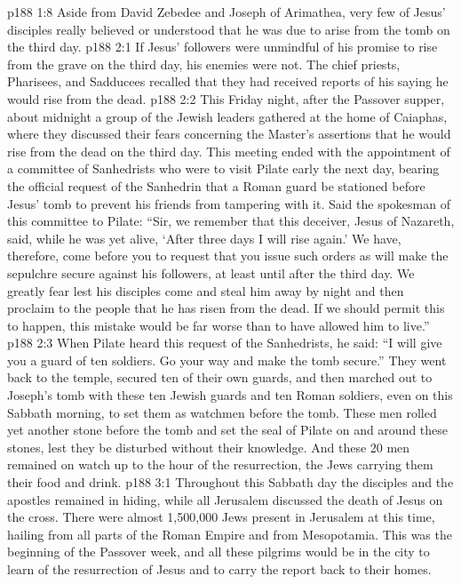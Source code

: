 \vs p188 1:8 Aside from David Zebedee and Joseph of Arimathea, very few of Jesus’ disciples really believed or understood that he was due to arise from the tomb on the third day.
\vs p188 2:1 If Jesus’ followers were unmindful of his promise to rise from the grave on the third day, his enemies were not. The chief priests, Pharisees, and Sadducees recalled that they had received reports of his saying he would rise from the dead.
\vs p188 2:2 This Friday night, after the Passover supper, about midnight a group of the Jewish leaders gathered at the home of Caiaphas, where they discussed their fears concerning the Master’s assertions that he would rise from the dead on the third day. This meeting ended with the appointment of a committee of Sanhedrists who were to visit Pilate early the next day, bearing the official request of the Sanhedrin that a Roman guard be stationed before Jesus’ tomb to prevent his friends from tampering with it. Said the spokesman of this committee to Pilate: “Sir, we remember that this deceiver, Jesus of Nazareth, said, while he was yet alive, ‘After three days I will rise again.’ We have, therefore, come before you to request that you issue such orders as will make the sepulchre secure against his followers, at least until after the third day. We greatly fear lest his disciples come and steal him away by night and then proclaim to the people that he has risen from the dead. If we should permit this to happen, this mistake would be far worse than to have allowed him to live.”
\vs p188 2:3 When Pilate heard this request of the Sanhedrists, he said: “I will give you a guard of ten soldiers. Go your way and make the tomb secure.” They went back to the temple, secured ten of their own guards, and then marched out to Joseph’s tomb with these ten Jewish guards and ten Roman soldiers, even on this Sabbath morning, to set them as watchmen before the tomb. These men rolled yet another stone before the tomb and set the seal of Pilate on and around these stones, lest they be disturbed without their knowledge. And these 20 men remained on watch up to the hour of the resurrection, the Jews carrying them their food and drink.
\vs p188 3:1 Throughout this Sabbath day the disciples and the apostles remained in hiding, while all Jerusalem discussed the death of Jesus on the cross. There were almost 1,500,000 Jews present in Jerusalem at this time, hailing from all parts of the Roman Empire and from Mesopotamia. This was the beginning of the Passover week, and all these pilgrims would be in the city to learn of the resurrection of Jesus and to carry the report back to their homes.
